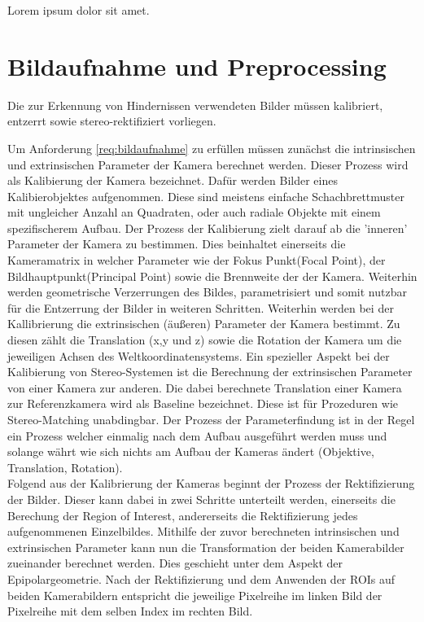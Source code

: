 Lorem ipsum dolor sit amet.

\section{Bildaufnahme und Preprocessing}
\label{sec:bildaufnahme_preprocessing}

	\begin{anforderung}
	\label{req:bildaufnahme}
		Die zur Erkennung von Hindernissen verwendeten Bilder müssen kalibriert, entzerrt sowie stereo-rektifiziert vorliegen.
	\end{anforderung}

\noindent
Um Anforderung \ref{req:bildaufnahme} zu erfüllen müssen zunächst die intrinsischen und extrinsischen Parameter der Kamera berechnet werden. Dieser Prozess wird als Kalibierung der Kamera bezeichnet. Dafür werden Bilder eines Kalibierobjektes aufgenommen. Diese sind meistens einfache Schachbrettmuster mit ungleicher Anzahl an Quadraten, oder auch radiale Objekte mit einem spezifischerem Aufbau. Der Prozess der Kalibierung zielt darauf ab die 'inneren' Parameter der Kamera zu bestimmen. Dies beinhaltet einerseits die Kameramatrix in welcher Parameter wie der Fokus Punkt(Focal Point), der Bildhauptpunkt(Principal Point) sowie die Brennweite der der Kamera. Weiterhin werden geometrische Verzerrungen des Bildes,  parametrisiert und somit nutzbar für die Entzerrung der Bilder in weiteren Schritten. Weiterhin werden bei der Kallibrierung die extrinsischen (äußeren) Parameter der Kamera bestimmt. Zu diesen zählt die Translation (x,y und z) sowie die Rotation der Kamera um die jeweiligen Achsen des Weltkoordinatensystems. Ein spezieller Aspekt bei der Kalibierung von Stereo-Systemen ist die Berechnung der extrinsischen Parameter von einer Kamera zur anderen. Die dabei berechnete Translation einer Kamera zur Referenzkamera wird als Baseline bezeichnet. Diese ist für Prozeduren wie Stereo-Matching unabdingbar. Der Prozess der Parameterfindung ist in der Regel ein Prozess welcher einmalig nach dem Aufbau ausgeführt werden muss und solange währt wie sich nichts am Aufbau der Kameras ändert (Objektive, Translation, Rotation).\\

\noindent
Folgend aus der Kalibrierung der Kameras beginnt der Prozess der Rektifizierung der Bilder. Dieser kann dabei in zwei Schritte unterteilt werden, einerseits die Berechung der Region of Interest, andererseits die Rektifizierung jedes aufgenommenen Einzelbildes. Mithilfe der zuvor berechneten intrinsischen und extrinsischen Parameter kann nun die Transformation der beiden Kamerabilder zueinander berechnet werden. Dies geschieht unter dem Aspekt der Epipolargeometrie. Nach der Rektifizierung und dem Anwenden der ROIs auf beiden Kamerabildern entspricht die jeweilige Pixelreihe im linken Bild der Pixelreihe mit dem selben Index im rechten Bild.\\

